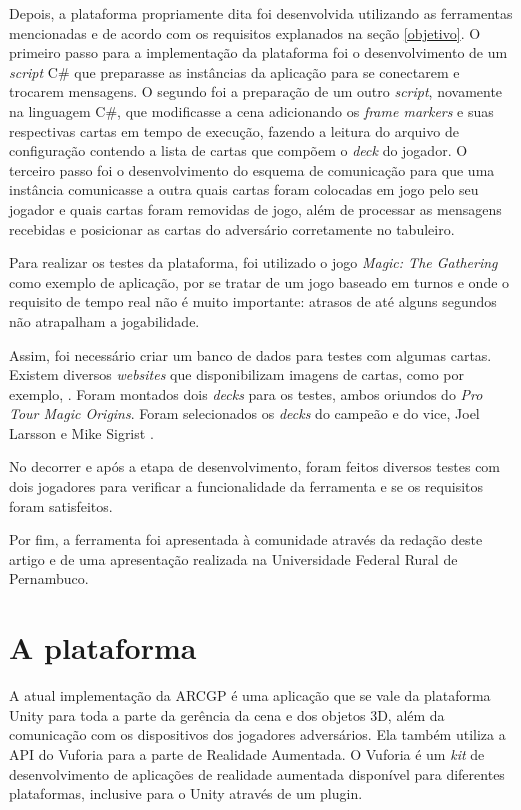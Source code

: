 \documentclass[conference]{IEEEtran}
\begin{document}
Depois, a plataforma propriamente dita foi desenvolvida utilizando as 
ferramentas mencionadas e de acordo com os requisitos explanados na seção 
\ref{objetivo}. O primeiro passo para a implementação da plataforma foi o 
desenvolvimento de um \textit{script} C\# que preparasse as instâncias da 
aplicação para se conectarem e trocarem mensagens. O segundo foi a preparação de 
um outro \textit{script}, novamente na linguagem C\#, que modificasse a cena 
adicionando os \textit{frame markers} e suas respectivas cartas em tempo de 
execução, fazendo a leitura do arquivo de configuração contendo a lista de 
cartas que compõem o \textit{deck} do jogador. O terceiro passo foi o 
desenvolvimento do esquema de comunicação para que uma instância comunicasse a 
outra quais cartas foram colocadas em jogo pelo seu jogador e quais cartas foram 
removidas de jogo, além de processar as mensagens recebidas e posicionar as 
cartas do adversário corretamente no tabuleiro.

Para realizar os testes da plataforma, foi utilizado o jogo \textit{Magic: The 
Gathering} como exemplo de aplicação, por se tratar de um jogo baseado em turnos 
e onde o requisito de tempo real não é muito importante: atrasos de até alguns 
segundos não atrapalham a jogabilidade. 

Assim, foi necessário criar um banco de dados para testes com algumas 
cartas. Existem diversos \textit{websites} que disponibilizam imagens de cartas, 
como por exemplo, \cite{magic_cards}. Foram montados dois \textit{decks} para 
os testes, ambos oriundos do \textit{Pro Tour Magic Origins}. Foram 
selecionados os \textit{decks} do campeão e do vice, Joel Larsson e Mike Sigrist 
\cite{protour}.

No decorrer e após a etapa de desenvolvimento, foram feitos diversos testes com 
dois jogadores para verificar a funcionalidade da ferramenta e se os requisitos 
foram satisfeitos.

Por fim, a ferramenta foi apresentada à comunidade através da redação deste 
artigo e de uma apresentação realizada na Universidade Federal Rural de 
Pernambuco.

\section{A plataforma}
\label{plataforma}
A atual implementação da ARCGP é uma aplicação que se vale da plataforma Unity 
\cite{unity} para toda a parte da gerência da cena e dos objetos 3D, além da 
comunicação com os dispositivos dos jogadores adversários. Ela também utiliza a 
API do Vuforia \cite{vuforia} para a parte de Realidade Aumentada. O Vuforia é 
um \textit{kit} de desenvolvimento de aplicações de realidade aumentada 
disponível para diferentes plataformas, inclusive para o Unity através de  um 
plugin.
\end{document}
